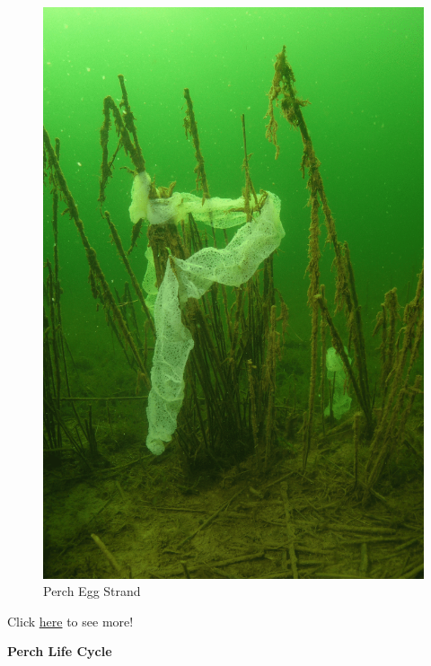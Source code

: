 \documentclass[
]{book}
\begin{document}
\begin{figure}
\centering
\includegraphics{images/Lab6_Egg_strand_perch.png}
\caption{Perch Egg Strand}
\end{figure}

Click \href{https://www.youtube.com/watch?v=T7xXfhOjtsU}{here} to see more!

\textbf{Perch Life Cycle}
\end{document}
